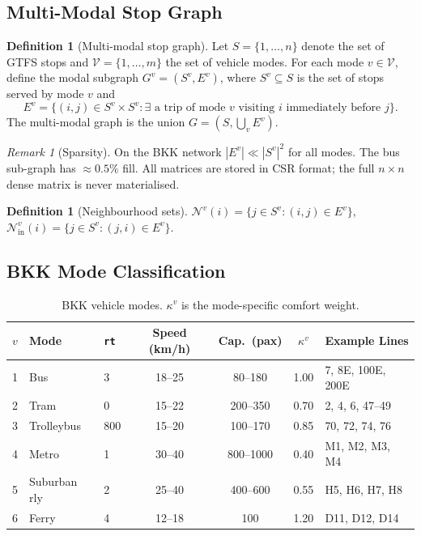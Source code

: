 \documentclass[11pt,a4paper]{article}
\theoremstyle{plain}
\theoremstyle{definition}
\newtheorem{definition}[theorem]{Definition}
\theoremstyle{remark}
\newtheorem{remark}[theorem]{Remark}
\begin{document}
\subsection{Multi-Modal Stop Graph}

\begin{definition}[Multi-modal stop graph]
Let $S=\{1,\ldots,n\}$ denote the set of GTFS stops and
$\mathcal{V}=\{1,\ldots,m\}$ the set of vehicle modes.  For each mode
$v\in\mathcal{V}$, define the modal subgraph $G^v=(S^v,E^v)$, where
$S^v\subseteq S$ is the set of stops served by mode $v$ and
\[
  E^v=\bigl\{(i,j)\in S^v\times S^v:\exists\text{ a trip of mode }v
    \text{ visiting }i\text{ immediately before }j\bigr\}.
\]
The multi-modal graph is the union $G=(S,\bigcup_v E^v)$.
\end{definition}

\begin{remark}[Sparsity]
On the BKK network $|E^v|\ll|S^v|^2$ for all modes.  The bus sub-graph has
$\approx0.5\%$ fill.  All matrices are stored in CSR format; the full
$n\times n$ dense matrix is never materialised.
\end{remark}

\begin{definition}[Neighbourhood sets]
$\mathcal{N}^v(i)=\{j\in S^v:(i,j)\in E^v\}$,\quad
$\mathcal{N}^v_{\mathrm{in}}(i)=\{j\in S^v:(j,i)\in E^v\}$.
\end{definition}

\subsection{BKK Mode Classification}

\begin{table}[h]
\centering
\caption{BKK vehicle modes.  $\kappa^v$ is the mode-specific comfort weight.}
\label{tab:modes}
\begin{tabular}{cllcccl}
\toprule
$v$ & Mode & \texttt{rt} & Speed (km/h) & Cap.\ (pax) & $\kappa^v$ & Example Lines \\
\midrule
1 & Bus          & 3   & 18--25 & 80--180   & 1.00 & 7, 8E, 100E, 200E \\
2 & Tram         & 0   & 15--22 & 200--350  & 0.70 & 2, 4, 6, 47--49 \\
3 & Trolleybus   & 800 & 15--20 & 100--170  & 0.85 & 70, 72, 74, 76 \\
4 & Metro        & 1   & 30--40 & 800--1000 & 0.40 & M1, M2, M3, M4 \\
5 & Suburban rly & 2   & 25--40 & 400--600  & 0.55 & H5, H6, H7, H8 \\
6 & Ferry        & 4   & 12--18 & 100       & 1.20 & D11, D12, D14 \\
\bottomrule
\end{tabular}
\end{table}
\end{document}
